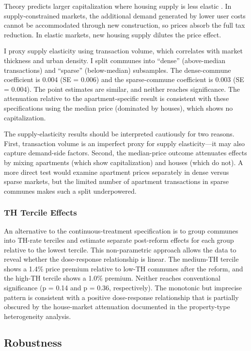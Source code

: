 \documentclass[12pt]{article}
\begin{document}
Theory predicts larger capitalization where housing supply is less elastic \citep{lutz2015fiscal}. In supply-constrained markets, the additional demand generated by lower user costs cannot be accommodated through new construction, so prices absorb the full tax reduction. In elastic markets, new housing supply dilutes the price effect.

I proxy supply elasticity using transaction volume, which correlates with market thickness and urban density. I split communes into ``dense'' (above-median transactions) and ``sparse'' (below-median) subsamples. The dense-commune coefficient is 0.004 (SE = 0.006) and the sparse-commune coefficient is 0.003 (SE = 0.004). The point estimates are similar, and neither reaches significance. The attenuation relative to the apartment-specific result is consistent with these specifications using the median price (dominated by houses), which shows no capitalization.

The supply-elasticity results should be interpreted cautiously for two reasons. First, transaction volume is an imperfect proxy for supply elasticity---it may also capture demand-side factors. Second, the median-price outcome attenuates effects by mixing apartments (which show capitalization) and houses (which do not). A more direct test would examine apartment prices separately in dense versus sparse markets, but the limited number of apartment transactions in sparse communes makes such a split underpowered.

\subsubsection{TH Tercile Effects}

An alternative to the continuous-treatment specification is to group communes into TH-rate terciles and estimate separate post-reform effects for each group relative to the lowest tercile. This non-parametric approach allows the data to reveal whether the dose-response relationship is linear. The medium-TH tercile shows a 1.4\% price premium relative to low-TH communes after the reform, and the high-TH tercile shows a 1.0\% premium. Neither reaches conventional significance (p = 0.14 and p = 0.36, respectively). The monotonic but imprecise pattern is consistent with a positive dose-response relationship that is partially obscured by the house-market attenuation documented in the property-type heterogeneity analysis.


\subsection{Robustness}
\end{document}

